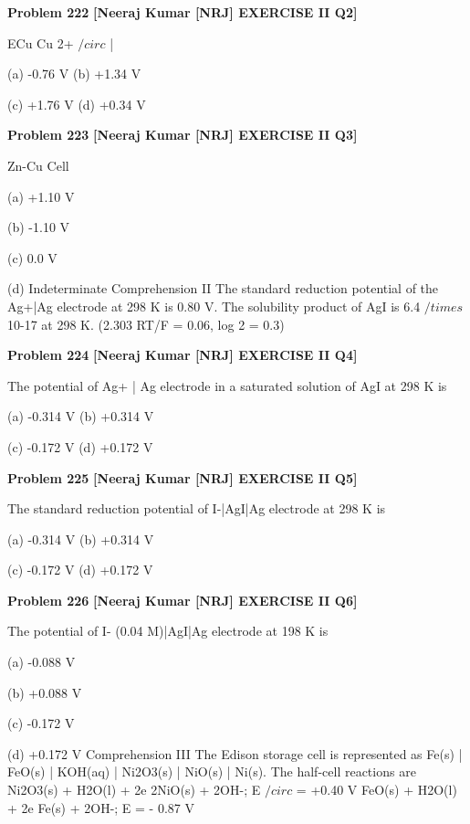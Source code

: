 \begin{problembox}
\textbf{Problem 222} \hfill \textbf{[Neeraj Kumar [NRJ] EXERCISE II Q2]}
\label{q:ext-nrj_all_questions-222}

ECu
Cu
2+
$/circ$
|
 
 (a) -0.76 V 
(b) +1.34 V
 
 (c) +1.76 V 
(d) +0.34 V
\end{problembox}

\begin{problembox}
\textbf{Problem 223} \hfill \textbf{[Neeraj Kumar [NRJ] EXERCISE II Q3]}
\label{q:ext-nrj_all_questions-223}

Zn-Cu Cell
 
 (a) +1.10 V
 
 (b) -1.10 V
 
 (c) 0.0 V
 
 (d) Indeterminate
Comprehension II
The standard reduction potential of the Ag+|Ag electrode at 298 K is 0.80 V. The solubility product of AgI is 6.4 $/times$ 10-17 
at 298 K. (2.303 RT/F = 0.06, log 2 = 0.3)
\end{problembox}

\begin{problembox}
\textbf{Problem 224} \hfill \textbf{[Neeraj Kumar [NRJ] EXERCISE II Q4]}
\label{q:ext-nrj_all_questions-224}

The potential of Ag+ | Ag electrode in a saturated 
solution of AgI at 298 K is
 
 (a) -0.314 V 
(b) +0.314 V
 
 (c) -0.172 V 
(d) +0.172 V
\end{problembox}

\begin{problembox}
\textbf{Problem 225} \hfill \textbf{[Neeraj Kumar [NRJ] EXERCISE II Q5]}
\label{q:ext-nrj_all_questions-225}

The standard reduction potential of I-|AgI|Ag 
electrode at 298 K is
 
 (a) -0.314 V 
(b) +0.314 V
 
 (c) -0.172 V 
(d) +0.172 V
\end{problembox}

\begin{problembox}
\textbf{Problem 226} \hfill \textbf{[Neeraj Kumar [NRJ] EXERCISE II Q6]}
\label{q:ext-nrj_all_questions-226}

The potential of I- (0.04 M)|AgI|Ag electrode at 
198 K is
 
 (a) -0.088 V
 
 (b) +0.088 V
 
 (c) -0.172 V
 
 (d) +0.172 V
Comprehension III
The Edison storage cell is represented as Fe(s) | FeO(s) | KOH(aq) | Ni2O3(s) | NiO(s) | Ni(s). The half-cell reactions are
Ni2O3(s) + H2O(l) + 2e   2NiO(s) + 2OH-; E $/circ$ = +0.40 V
FeO(s) + H2O(l) + 2e   Fe(s) + 2OH-; E  = - 0.87 V
\end{problembox}

